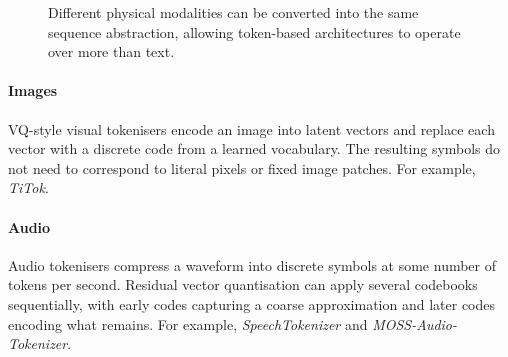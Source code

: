 \begin{figure}[htbp]
    \centering
    \caption{Different physical modalities can be converted into the same sequence abstraction, allowing token-based architectures to operate over more than text.}
    \label{fig:multimodal-tokenisers}
\end{figure}

\paragraph{Images}
VQ-style visual tokenisers encode an image into latent vectors and replace each vector with a discrete code from a learned vocabulary.
The resulting symbols do not need to correspond to literal pixels or fixed image patches.
For example, \textit{TiTok}.

\paragraph{Audio}
Audio tokenisers compress a waveform into discrete symbols at some number of tokens per second.
Residual vector quantisation can apply several codebooks sequentially, with early codes capturing a coarse approximation and later codes encoding what remains.
For example, \textit{SpeechTokenizer} and \textit{MOSS-Audio-Tokenizer}.

